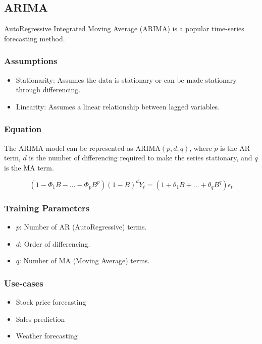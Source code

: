 \documentclass[english]{latex4ei/latex4ei_sheet}
\begin{document}
\begin{sectionbox}
\subsection{ARIMA}

AutoRegressive Integrated Moving Average (ARIMA) is a popular time-series forecasting method.

\subsubsection{Assumptions}
\begin{itemize}
    \item Stationarity: Assumes the data is stationary or can be made stationary through differencing.
    \item Linearity: Assumes a linear relationship between lagged variables.
\end{itemize}

\subsubsection{Equation}
The ARIMA model can be represented as ARIMA\((p, d, q)\), where \(p\) is the AR term, \(d\) is the number of differencing required to make the series stationary, and \(q\) is the MA term.

\[
(1 - \Phi_{1}B - \ldots - \Phi_{p}B^{p}) (1 - B)^{d} Y_{t} = (1 + \theta_{1}B + \ldots + \theta_{q}B^{q}) \epsilon_{t}
\]

\subsubsection{Training Parameters}
\begin{itemize}
    \item \(p\): Number of AR (AutoRegressive) terms.
    \item \(d\): Order of differencing.
    \item \(q\): Number of MA (Moving Average) terms.
\end{itemize}

\subsubsection{Use-cases}
\begin{itemize}
    \item Stock price forecasting
    \item Sales prediction
    \item Weather forecasting
\end{itemize}


\end{sectionbox}
\end{document}

